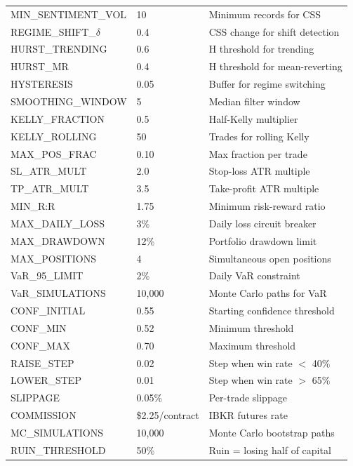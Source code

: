 \documentclass[12pt,a4paper]{article}
\begin{document}
\begin{longtable}{@{}p{5cm}p{3cm}p{6.5cm}@{}}
MIN\_SENTIMENT\_VOL & 10 & Minimum records for CSS \\
REGIME\_SHIFT\_$\delta$ & 0.4 & CSS change for shift detection \\
\midrule
HURST\_TRENDING & 0.6 & H threshold for trending \\
HURST\_MR & 0.4 & H threshold for mean-reverting \\
HYSTERESIS & 0.05 & Buffer for regime switching \\
SMOOTHING\_WINDOW & 5 & Median filter window \\
\midrule
KELLY\_FRACTION & 0.5 & Half-Kelly multiplier \\
KELLY\_ROLLING & 50 & Trades for rolling Kelly \\
MAX\_POS\_FRAC & 0.10 & Max fraction per trade \\
SL\_ATR\_MULT & 2.0 & Stop-loss ATR multiple \\
TP\_ATR\_MULT & 3.5 & Take-profit ATR multiple \\
MIN\_R:R & 1.75 & Minimum risk-reward ratio \\
MAX\_DAILY\_LOSS & 3\% & Daily loss circuit breaker \\
MAX\_DRAWDOWN & 12\% & Portfolio drawdown limit \\
MAX\_POSITIONS & 4 & Simultaneous open positions \\
VaR\_95\_LIMIT & 2\% & Daily VaR constraint \\
VaR\_SIMULATIONS & 10{,}000 & Monte Carlo paths for VaR \\
\midrule
CONF\_INITIAL & 0.55 & Starting confidence threshold \\
CONF\_MIN & 0.52 & Minimum threshold \\
CONF\_MAX & 0.70 & Maximum threshold \\
RAISE\_STEP & 0.02 & Step when win rate $<$ 40\% \\
LOWER\_STEP & 0.01 & Step when win rate $>$ 65\% \\
\midrule
SLIPPAGE & 0.05\% & Per-trade slippage \\
COMMISSION & \$2.25/contract & IBKR futures rate \\
MC\_SIMULATIONS & 10{,}000 & Monte Carlo bootstrap paths \\
RUIN\_THRESHOLD & 50\% & Ruin = losing half of capital \\
\end{longtable}
\end{document}
